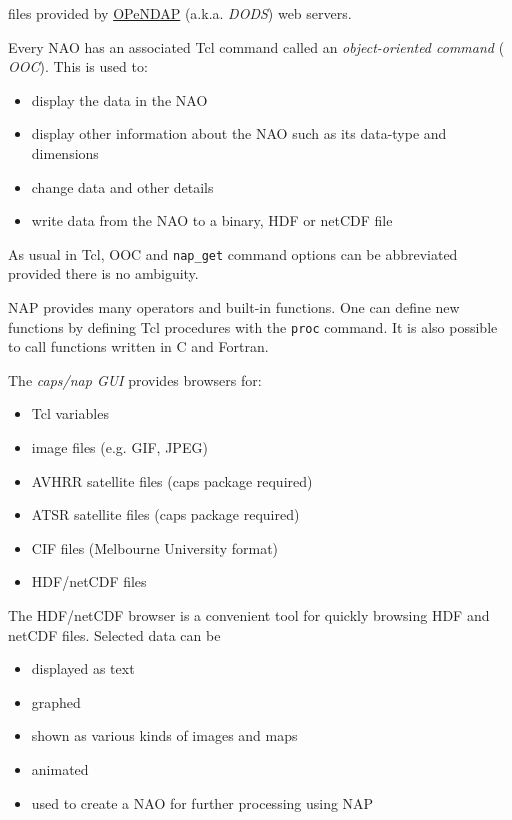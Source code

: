   files provided by 
  \href{http://www.opendap.org/}{OPeNDAP} (a.k.a. 
  \emph{DODS}) web servers.
  \par Every NAO has an associated Tcl command called an 
  \emph{object-oriented command} (
  \emph{OOC}). This is used to:
  \begin{itemize}
    \item display the data in the NAO
    \item display other information about the NAO such as its data-type
    and dimensions
    \item change data and other details
    \item write data from the NAO to a binary, HDF or netCDF file
  \end{itemize}
  \par As usual in Tcl, OOC and 
  \texttt{nap\_get} command options can be abbreviated provided
  there is no ambiguity.
  \par NAP provides many operators and built-in functions. One can define
  new functions by defining Tcl procedures with the 
  \texttt{proc} command. It is also possible to call functions
  written in C and Fortran.
  \par The 
  \emph{caps/nap GUI} provides browsers for:
  \begin{itemize}
    \item Tcl variables
    \item image files (e.g. GIF, JPEG)
    \item AVHRR satellite files (caps package required)
    \item ATSR satellite files (caps package required)
    \item CIF files (Melbourne University format)
    \item HDF/netCDF files
  \end{itemize}The HDF/netCDF browser is a convenient tool for quickly browsing
  HDF and netCDF files. Selected data can be
  \begin{itemize}
    \item displayed as text
    \item graphed
    \item shown as various kinds of images and maps
    \item animated
    \item used to create a NAO for further processing using NAP
  \end{itemize}
